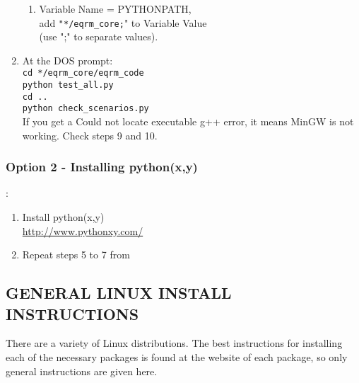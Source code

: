 \documentclass[a4paper, 12pt]{article}
\begin{document}
\begin{enumerate}
\begin{enumerate}
\item Variable Name = PYTHONPATH, \\
add \texttt{"*/eqrm\_core;}" to Variable Value \\
(use ";" to separate values).
\end{enumerate}

\item At the DOS prompt: \\
\texttt{cd */eqrm\_core/eqrm\_code} \\
\texttt{python test\_all.py} \\
\texttt{cd ..} \\
\texttt{python check\_scenarios.py} \\
If you get a Could not locate executable g++ error, it means MinGW
is not working.  Check steps 9 and 10.
\end{enumerate}
%
%
%
\subsubsection{Option 2 - Installing python(x,y)}:
\label{sec:windows-option2}

\begin{enumerate}
\item Install python(x,y) \\
\url{http://www.pythonxy.com/}
\item Repeat steps 5 to 7 from 
\end{enumerate}


\subsection{GENERAL LINUX INSTALL INSTRUCTIONS}

There are a variety of Linux distributions.  The best instructions
for installing each of the necessary packages is found at the
website of each package, so only general instructions are given
here.
\end{document}
